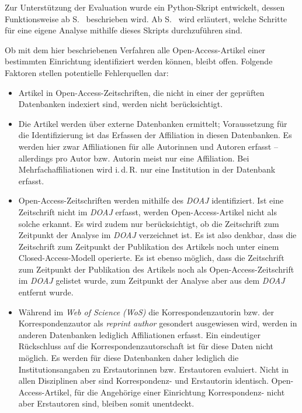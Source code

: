 Zur Unterstützung der Evaluation wurde ein Python-Skript entwickelt, dessen Funktionsweise ab S.~\pageref{funktionsweise} beschrieben wird. Ab S.~\pageref{analysis} wird erläutert, welche Schritte für eine eigene Analyse mithilfe dieses Skripts durchzuführen sind.

Ob mit dem hier beschriebenen Verfahren alle Open-Access-Artikel einer bestimmten Einrichtung identifiziert werden können, bleibt offen. Folgende Faktoren stellen potentielle Fehlerquellen dar:
\begin{itemize}
\item Artikel in Open-Access-Zeitschriften, die nicht in einer der geprüften Datenbanken indexiert sind, werden nicht berücksichtigt.
\item Die Artikel werden über externe Datenbanken ermittelt; Voraussetzung für die Identifizierung ist das Erfassen der Affiliation in diesen Datenbanken. Es werden hier zwar Affiliationen für alle Autorinnen und Autoren erfasst -- allerdings pro Autor bzw. Autorin meist nur eine Affiliation. Bei Mehrfachaffiliationen wird i.\,d.\,R. nur eine Institution in der Datenbank erfasst.
\item Open-Access-Zeitschriften werden mithilfe des \textit{DOAJ} identifiziert. Ist eine Zeitschrift nicht im \textit{DOAJ} erfasst, werden Open-Access-Artikel nicht als solche erkannt. Es wird zudem nur berücksichtigt, ob die Zeitschrift zum Zeitpunkt der Analyse im \textit{DOAJ} verzeichnet ist. Es ist also denkbar, dass die Zeitschrift zum Zeitpunkt der Publikation des Artikels noch unter einem Closed-Access-Modell operierte. Es ist ebenso möglich, dass die Zeitschrift zum Zeitpunkt der Publikation des Artikels noch als Open-Access-Zeitschrift im \textit{DOAJ} gelistet wurde, zum Zeitpunkt der Analyse aber aus dem \textit{DOAJ} entfernt wurde.
\item Während im \textit{Web of Science (WoS)} die Korrespondenzautorin bzw. der Korrespondenzautor als \textit{reprint author} gesondert ausgewiesen wird, werden in anderen Datenbanken lediglich Affiliationen erfasst. Ein eindeutiger Rückschluss auf die Korrespondenzautorschaft ist für diese Daten nicht möglich. Es werden für diese Datenbanken daher lediglich die Institutionsangaben zu Erstautorinnen bzw. Erstautoren evaluiert. Nicht in allen Disziplinen aber sind Korrespondenz- und Erstautorin identisch. Open-Access-Artikel, für die Angehörige einer Einrichtung Korrespondenz- nicht aber Erstautoren sind, bleiben somit unentdeckt.
\end{itemize}